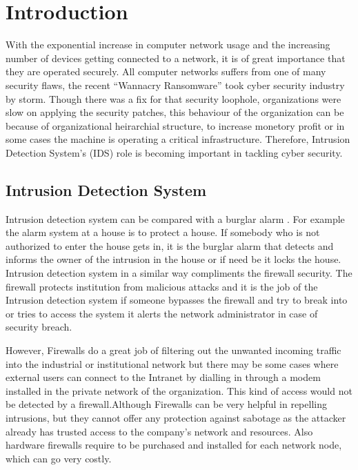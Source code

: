 \documentclass[12pt, a4paper]{report}
\begin{document}
\chapter{Introduction}\label{sec:intro}
\justify
With the exponential increase in computer network usage and the increasing number of devices getting connected to a network, it is of great importance that they are operated securely. All computer networks suffers from one of many security flaws, the recent ``Wannacry Ransomware'' took cyber security industry by storm. Though there was a fix for that security loophole, organizations were slow on applying the security patches, this behaviour of the organization can be because of organizational heirarchial structure, to increase monetory profit or in some cases the machine is operating a critical infrastructure. Therefore, Intrusion Detection System's (IDS) role is becoming important in tackling cyber security.\\ \par

\section{Intrusion Detection System}\label{sec:introintrusion}

\justify
Intrusion detection system can be compared with a burglar alarm \cite{IDS}. For example the alarm system at a house is to protect a house. If somebody who is not authorized to enter the house gets in, it is the burglar alarm that detects and informs the owner of the intrusion in the house or if need be it locks the house. Intrusion detection system in a similar way compliments the firewall security. The firewall protects institution from malicious attacks and it is the job of the Intrusion detection system if someone bypasses the firewall and try to break into or tries to access the system  it alerts the network administrator in case of security breach.\\ \par

However, Firewalls do a great job of filtering out the unwanted incoming traffic into the industrial or institutional network but there may be some cases where external users can connect to the Intranet by dialling in through a modem installed in the private network of the organization.\cite{IDS} This kind of access would not be detected by a firewall.Although Firewalls can be very helpful in repelling intrusions, but they cannot offer any protection against sabotage as the attacker already has trusted access to the company's network and resources. Also hardware firewalls require to be purchased and installed for each network node, which can go very costly.\\
\par
\end{document}
